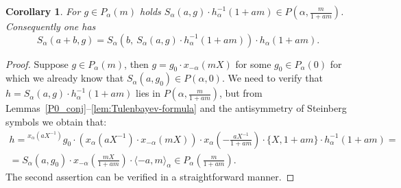 \documentclass[oneside, 8pt]{amsart}
\newtheorem{corollary}{Corollary}
\newtheorem{lemma}{Lemma}
\theoremstyle{remark}
\theoremstyle{definition}
\DeclareMathOperator{\St}{St}
\numberwithin{equation}{section}
\begin{document}
\begin{corollary} For $g \in P_\alpha(m)$ holds $S_\alpha(a, g) \cdot h_\alpha^{-1}(1 + am) \in P(\alpha, \frac{m}{1 + am})$.
Consequently one has \[ S_\alpha(a+b, g) = S_\alpha\left(b,\ S_\alpha(a, g) \cdot h_\alpha^{-1}(1 + am)\right)\cdot h_\alpha(1+am). \]\end{corollary}
\begin{proof}
Suppose $g \in P_\alpha(m)$, then $g = g_0 \cdot x_{-\alpha}(mX)$ for some $g_0 \in P_\alpha(0)$ for which we already know that $S_\alpha(a, g_0) \in P(\alpha, 0)$.
We need to verify that $h = S_\alpha(a, g) \cdot h_\alpha^{-1}(1 + am)$ lies in $P\left(\alpha, \frac{m}{1 + am}\right)$, but from Lemmas~\ref{P0_conj}--\ref{lem:Tulenbayev-formula} and the antisymmetry of Steinberg symbols we obtain that:
\begin{multline} \nonumber h = {}^{x_\alpha(aX^{-1})}\!g_0 \cdot \left(x_{\alpha}(aX^{-1}) \cdot x_{-\alpha}(mX)\right) \cdot x_{\alpha}\left(-\frac{aX^{-1}}{1+am}\right) \cdot \{X, 1+am\} \cdot h_\alpha^{-1}(1 + am) = \\
= S_\alpha(a, g_0) \cdot x_{-\alpha}\left(\frac{mX}{1+am}\right) \cdot \langle -a, m\rangle_\alpha \in P_\alpha\left(\frac{m}{1+am}\right). \end{multline}
The second assertion can be verified in a straightforward manner. \end{proof}

\begin{comment}
\begin{lemma} If $\alpha - \beta \in \Phi$ then for all $g \in \St(\Phi, R[X], XM[X])$ holds $S_\alpha(a, g) \in P_\beta(0)$. \end{lemma}
\begin{proof}
It suffices to verify the assertion for the generators $z_\gamma(Xf, g)$, $\gamma \in \Phi$.
By our assumption $(\alpha, \beta) \geq 0$. 
\end{proof}
\end{comment}
\end{document}
